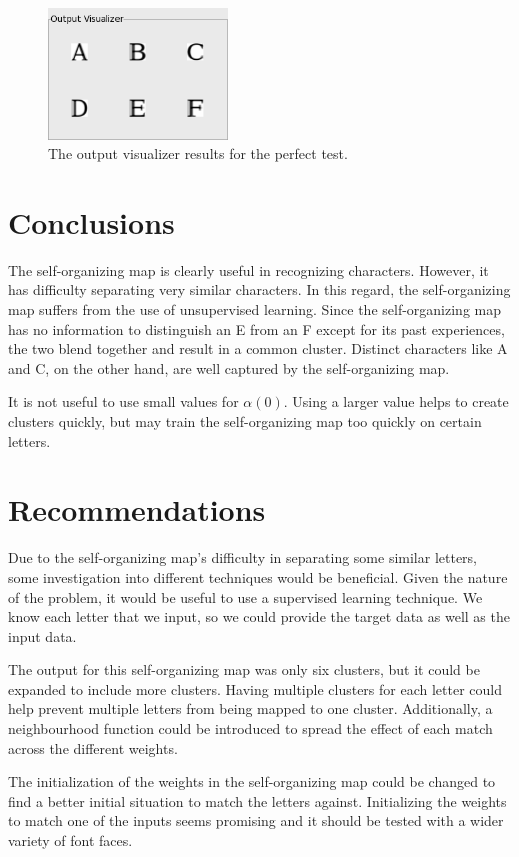 \documentclass[12pt,letterpaper,oneside]{report}
\begin{document}
\begin{figure}[ht]
  \centering
  \includegraphics[width=180px]{diagrams/perfect-test.png} 
  \caption{The output visualizer results for the perfect test.}
  \label{fig:perfect-test}
\end{figure}

\section{Conclusions}
The self-organizing map is clearly useful in recognizing characters. However, it has difficulty separating very similar characters. In this regard, the self-organizing map suffers from the use of unsupervised learning. Since the self-organizing map has no information to distinguish an E from an F except for its past experiences, the two blend together and result in a common cluster. Distinct characters like A and C, on the other hand, are well captured by the self-organizing map. 

It is not useful to use small values for $\alpha(0)$. Using a larger value helps to create clusters quickly, but may train the self-organizing map too quickly on certain letters.

\section{Recommendations}
Due to the self-organizing map's difficulty in separating some similar letters, some investigation into different techniques would be beneficial. Given the nature of the problem, it would be useful to use a supervised learning technique. We know each letter that we input, so we could provide the target data as well as the input data.

The output for this self-organizing map was only six clusters, but it could be expanded to include more clusters. Having multiple clusters for each letter could help prevent multiple letters from being mapped to one cluster. Additionally, a neighbourhood function could be introduced to spread the effect of each match across the different weights.

The initialization of the weights in the self-organizing map could be changed to find a better initial situation to match the letters against. Initializing the weights to match one of the inputs seems promising and it should be tested with a wider variety of font faces.
\end{document}
